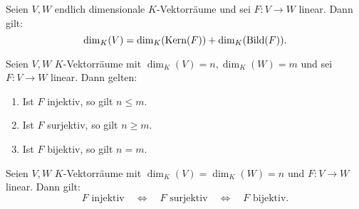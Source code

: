 \setcounter{satz}{14}
\begin{satz}
	\label{satz:I.10.15}
	Seien $V,W$ endlich dimensionale $K$-Vektorräume und sei $F \colon V \rightarrow W$ linear. 
	Dann gilt:
	\[
		\dim_K(V) = \dim_K(\operatorname{Kern}(F)) + \dim_K(\operatorname{Bild}(F)).
	\]
\end{satz}
\newpage
\begin{korollar}
	\label{kor:I.10.16}
	Seien $V,W$ $K$-Vektorräume mit $\dim_K(V) = n, \dim_K(W) = m$ und sei $F\colon V \rightarrow W$ linear.
	Dann gelten:
	\begin{enumerate}[(1)]
		\item Ist $F$ injektiv, so gilt $n \leq m$.
		\item Ist $F$ surjektiv, so gilt $n \geq m$.
		\item Ist $F$ bijektiv, so gilt $n = m$.
	\end{enumerate}
\end{korollar}

\begin{korollar}
	\label{kor:I.10.17}
	Seien $V,W$ $K$-Vektorräume mit $\dim_K(V) = \dim_K(W) = n$ und $F \colon V \rightarrow W$ linear.
	Dann gilt:
	\[
		F \text{ injektiv} \quad \Leftrightarrow \quad F \text{ surjektiv} \quad \Leftrightarrow \quad F \text{ bijektiv}.
	\]
\end{korollar}
\newpage